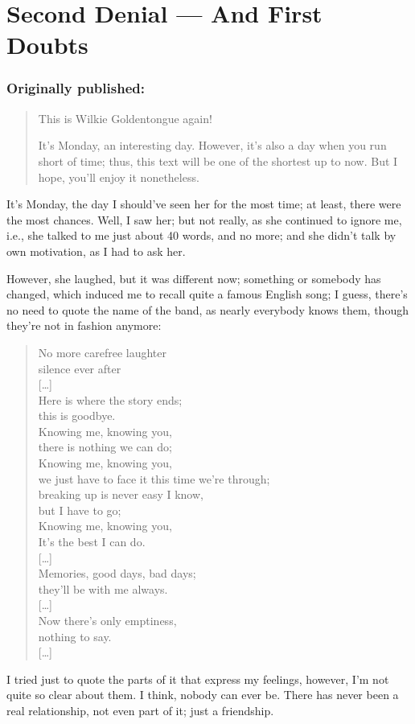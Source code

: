\chapter{Second Denial --- And First Doubts}
\label{cha:second-denial-first-doubts}
\subsection*{Originally published: }
\begin{quote}
This is Wilkie Goldentongue again!

It's Monday, an interesting day. However, it's also a day when you run short of time; thus, this text will be one of the shortest up to now. But I hope, you'll enjoy it nonetheless. 
\end{quote}

It's Monday, the day I should've seen her for the most time; at least, there were the most chances. Well, I saw her; but not really, as she continued to ignore me, i.e., she talked to me just about 40 words, and no more; and she didn't talk by own motivation, as I had to ask her.

However, she laughed, but it was different now; something or somebody has changed, which induced me to recall quite a famous English song; I guess, there's no need to quote the name of the band, as nearly everybody knows them, though they're not in fashion anymore:
\begin{quote}
No more carefree laughter\\
silence ever after\\
{[\ldots]}\\
Here is where the story ends;\\
this is goodbye.\\
Knowing me, knowing you,\\
there is nothing we can do; \\
Knowing me, knowing you, \\
we just have to face it this time we're through;\\
breaking up is never easy I know,\\
but I have to go;\\
Knowing me, knowing you,\\
It's the best I can do. \\
{[\ldots]}\\
Memories, good days, bad days;\\
they'll be with me always. \\
{[\ldots]}\\
Now there's only emptiness,\\
nothing to say.\\
{[\ldots]}
\end{quote}
I tried just to quote the parts of it that express my feelings, however, I'm not quite so clear about them. I think, nobody can ever be. There has never been a real relationship, not even part of it; just a friendship.

